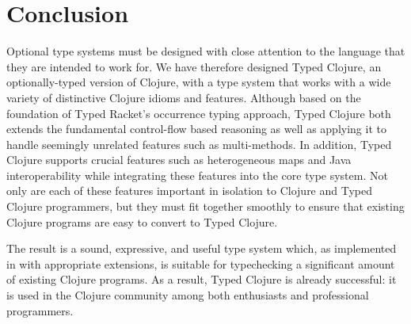 \section{Conclusion}
\label{sec:conclusion}

Optional type systems must be designed with close attention to the
language that they are intended to work for.
We have therefore designed Typed Clojure, an optionally-typed version of
Clojure, with a type system that works with a wide variety of distinctive
Clojure idioms and features. Although based on the foundation of Typed
Racket's occurrence typing approach, Typed Clojure both extends the
fundamental control-flow based reasoning as well as applying it to
handle seemingly unrelated features such as multi-methods. In
addition, Typed Clojure supports crucial features such as
heterogeneous maps and Java interoperability while integrating these
features into the core type system. Not only are each of these
features important in isolation to Clojure and Typed Clojure
programmers, but they must fit together smoothly to ensure that
existing Clojure programs are easy to convert to Typed Clojure.

The result is a sound, expressive, and useful type system which, as
implemented in \coretyped with appropriate extensions, is suitable for
typechecking a significant amount of existing Clojure programs.
%
As a result, Typed Clojure is already successful: it is used in
the Clojure community among both enthusiasts and professional
programmers.%




%

